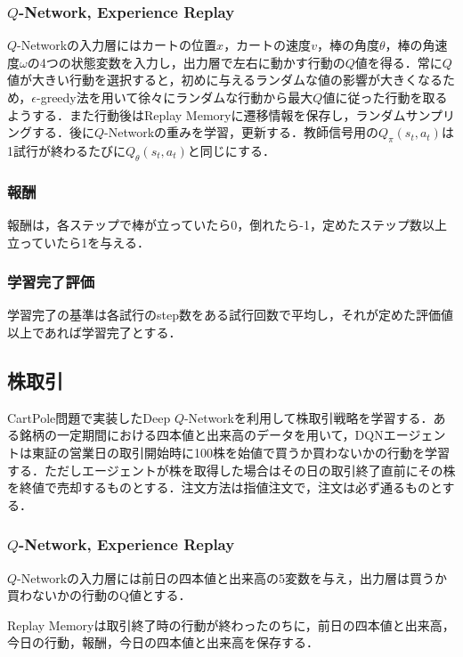 \documentclass[twocolumn]{jarticle}
\begin{document}
        \subsubsection{$Q$-Network, Experience Replay}
        $Q$-Networkの入力層にはカートの位置$x$，カートの速度$v$，棒の角度$\theta$，棒の角速度$\omega$の4つの状態変数を入力し，出力層で左右に動かす行動の$Q$値を得る．常に$Q$値が大きい行動を選択すると，初めに与えるランダムな値の影響が大きくなるため，$\epsilon$-greedy法を用いて徐々にランダムな行動から最大$Q$値に従った行動を取るようする．また行動後はReplay Memoryに遷移情報を保存し，ランダムサンプリングする．後に$Q$-Networkの重みを学習，更新する．教師信号用の$Q_\pi(s_t,a_t)$は1試行が終わるたびに$Q_\theta(s_t,a_t)$と同じにする．

        \subsubsection{報酬}
        報酬は，各ステップで棒が立っていたら0，倒れたら-1，定めたステップ数以上立っていたら1を与える．

        \subsubsection{学習完了評価}
        学習完了の基準は各試行のstep数をある試行回数で平均し，それが定めた評価値以上であれば学習完了とする．
    
    \subsection{株取引}
    CartPole問題で実装したDeep $Q$-Networkを利用して株取引戦略を学習する．ある銘柄の一定期間における四本値と出来高のデータを用いて，DQNエージェントは東証の営業日の取引開始時に100株を始値で買うか買わないかの行動を学習する．ただしエージェントが株を取得した場合はその日の取引終了直前にその株を終値で売却するものとする．注文方法は指値注文で，注文は必ず通るものとする．

        \subsubsection{$Q$-Network, Experience Replay}
        $Q$-Networkの入力層には前日の四本値と出来高の5変数を与え，出力層は買うか買わないかの行動のQ値とする．
        
        Replay Memoryは取引終了時の行動が終わったのちに，前日の四本値と出来高，今日の行動，報酬，今日の四本値と出来高を保存する．
\end{document}
